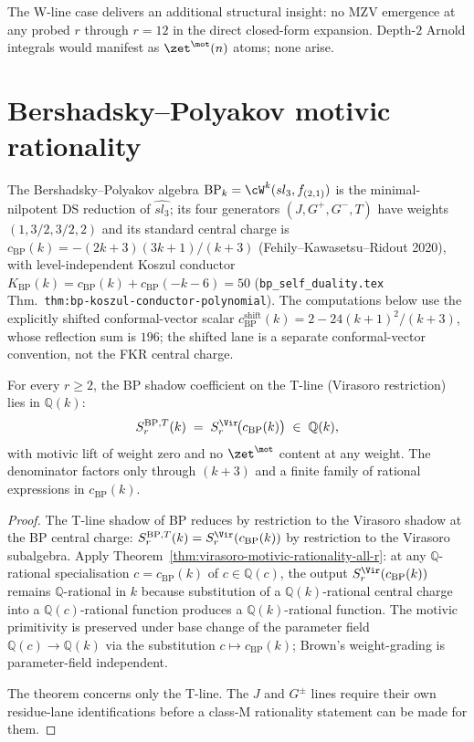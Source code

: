 The W-line case delivers an additional structural insight: no MZV
emergence at any probed $r$ through $r = 12$ in the direct
closed-form expansion. Depth-$2$ Arnold integrals would manifest as
$\zet^{\mot}(n)$ atoms; none arise.

\section{Bershadsky--Polyakov motivic rationality}
\label{sec:bp-motivic-rationality}

The Bershadsky--Polyakov algebra $\mathrm{BP}_k = \cW^k(sl_3,
f_{(2,1)})$ is the minimal-nilpotent DS reduction of $\widehat{sl_3}$;
its four generators $(J, G^+, G^-, T)$ have weights $(1, 3/2, 3/2, 2)$
and its standard central charge is
$c_{\mathrm{BP}}(k) = -(2k+3)(3k+1)/(k+3)$
(Fehily--Kawasetsu--Ridout 2020), with level-independent Koszul
conductor
$K_{\mathrm{BP}}(k) = c_{\mathrm{BP}}(k) + c_{\mathrm{BP}}(-k-6) = 50$
(\texttt{bp\_self\_duality.tex} Thm.\
\texttt{thm:bp-koszul-conductor-polynomial}). The computations below
use the explicitly shifted conformal-vector scalar
$c^{\mathrm{shift}}_{\mathrm{BP}}(k) = 2 - 24(k+1)^2/(k+3)$, whose
reflection sum is $196$; the shifted lane is a separate
conformal-vector convention, not the FKR central charge.

\begin{theorem}
\ClaimStatusProvedHere
For every $r \geq 2$, the BP shadow coefficient on the T-line
(Virasoro restriction) lies in $\mathbb{Q}(k)$:
\[
 S_r^{\mathrm{BP}, T}(k) \;=\;
 S_r^{\Vir}\!\bigl(c_{\mathrm{BP}}(k)\bigr)
 \;\in\;
 \mathbb{Q}(k),
\]
with motivic lift of weight zero and no $\zet^{\mot}$ content at any
weight. The denominator factors only through
$(k+3)$ and a finite family of rational expressions in
$c_{\mathrm{BP}}(k)$.
\end{theorem}

\begin{proof}
The T-line shadow of BP reduces by restriction to the Virasoro
shadow at the BP central charge: $S_r^{\mathrm{BP}, T}(k) =
S_r^{\Vir}(c_{\mathrm{BP}}(k))$ by restriction to the Virasoro
subalgebra. Apply
Theorem~\ref{thm:virasoro-motivic-rationality-all-r}: at any
$\mathbb{Q}$-rational specialisation $c = c_{\mathrm{BP}}(k)$ of
$c \in \mathbb{Q}(c)$, the output $S_r^{\Vir}(c_{\mathrm{BP}}(k))$
remains $\mathbb{Q}$-rational in $k$ because substitution of a
$\mathbb{Q}(k)$-rational central charge into a $\mathbb{Q}(c)$-rational
function produces a $\mathbb{Q}(k)$-rational function. The motivic
primitivity is preserved under base change of the parameter field
$\mathbb{Q}(c) \to \mathbb{Q}(k)$ via the substitution $c \mapsto
c_{\mathrm{BP}}(k)$; Brown's weight-grading is parameter-field
independent.

The theorem concerns only the T-line. The $J$ and $G^\pm$ lines require
their own residue-lane identifications before a class-M rationality
statement can be made for them.
\end{proof}

